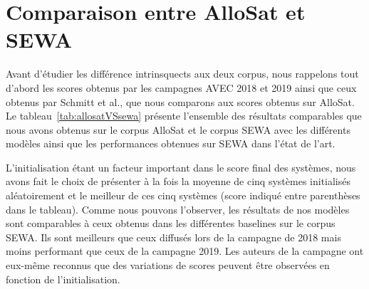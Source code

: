 \section{Comparaison entre AlloSat et SEWA}
Avant d'étudier les différence intrinsquects aux deux corpus, nous rappelons tout d'abord les scores obtenus par les campagnes AVEC 2018 et 2019 ainsi que ceux obtenus par Schmitt et al., que nous comparons aux scores obtenus sur AlloSat. Le tableau~\ref{tab:allosatVSsewa} présente l'ensemble des résultats comparables que nous avons obtenus sur le corpus AlloSat et le corpus SEWA avec les différents modèles ainsi que les performances obtenues sur SEWA dans l'état de l'art.
%
%



 L'initialisation étant un facteur important dans le score final des systèmes, nous avons fait le choix de présenter à la fois la moyenne de cinq systèmes initialisés aléatoirement et le meilleur de ces cinq systèmes (score indiqué entre parenthèses dans le tableau). Comme nous pouvons l'observer, les résultats de nos modèles sont comparables à ceux obtenus dans les différentes baselines sur le corpus SEWA. Ils sont meilleurs que ceux diffusés lors de la campagne de 2018 mais moins performant que ceux de la campagne 2019. Les auteurs de la campagne ont eux-même reconnus que des variations de scores peuvent être observées en fonction de l'initialisation.

